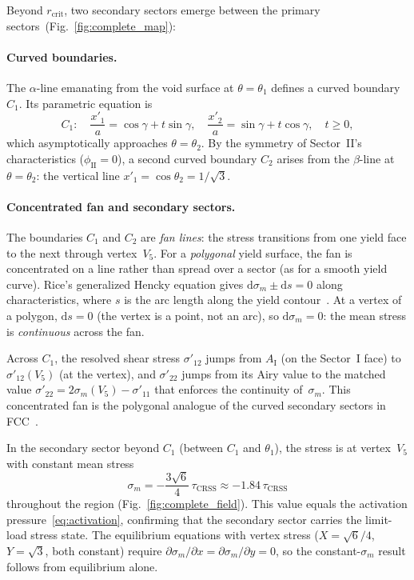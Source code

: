 \documentclass{svjour3} %
\newcommand{\diff}{\mathrm{d}}
\newcommand{\tcrss}{\tau_{\mathrm{CRSS}}}
\newcommand{\sm}{\sigma_m}
\begin{document}
Beyond $r_{\mathrm{crit}}$, two secondary sectors emerge between the
primary sectors~(Fig.~\ref{fig:complete_map}):

\paragraph{Curved boundaries.}
The $\alpha$-line emanating from the void surface at $\theta = \theta_1$
defines a curved boundary $C_1$. Its parametric equation is
\begin{equation}
\label{eq:C1}
C_1:\quad \frac{x'_1}{a} = \cos\gamma + t\sin\gamma,\quad
\frac{x'_2}{a} = \sin\gamma + t\cos\gamma, \quad t \geq 0,
\end{equation}
which asymptotically approaches $\theta = \theta_2$. By the symmetry
of Sector~II's characteristics ($\phi_{\mathrm{II}} = 0$), a second
curved boundary $C_2$ arises from the $\beta$-line at
$\theta = \theta_2$: the vertical line
$x'_1 = \cos\theta_2 = 1/\sqrt{3}$.

\paragraph{Concentrated fan and secondary sectors.}
The boundaries $C_1$ and $C_2$ are \emph{fan lines}: the stress
transitions from one yield face to the next through vertex~$V_5$.
For a \emph{polygonal} yield surface, the fan is concentrated on a
line rather than spread over a sector (as for a smooth yield
curve). Rice's generalized Hencky equation gives $\diff\sm \pm
\diff s = 0$ along characteristics, where $s$ is the arc length
along the yield contour~\citep{rice1973}. At a vertex of a polygon,
$\diff s = 0$ (the vertex is a point, not an arc), so
$\diff\sm = 0$: the mean stress is \emph{continuous} across the
fan.

Across $C_1$, the resolved shear stress $\sigma'_{12}$ jumps from
$A_{\mathrm{I}}$ (on the Sector~I face) to $\sigma'_{12}(V_5)$ (at the
vertex), and $\sigma'_{22}$ jumps from its Airy value to the matched
value $\sigma'_{22} = 2\sm(V_5) - \sigma'_{11}$ that enforces the
continuity of~$\sm$. This concentrated fan is the polygonal analogue
of the curved secondary sectors in FCC~\citep[Section~3.8]{kysar2005}.

In the secondary sector beyond $C_1$ (between $C_1$ and $\theta_1$),
the stress is at vertex~$V_5$ with constant mean stress
\begin{equation}
\label{eq:sm_secondary}
\sm = -\frac{3\sqrt{6}}{4}\,\tcrss \approx -1.84\,\tcrss
\end{equation}
throughout the region (Fig.~\ref{fig:complete_field}). This value
equals the activation pressure~\eqref{eq:activation}, confirming
that the secondary sector carries the limit-load stress state.
The equilibrium equations with vertex stress ($X = \sqrt{6}/4$,
$Y = \sqrt{3}$, both constant) require $\partial\sm/\partial x =
\partial\sm/\partial y = 0$, so the constant-$\sm$ result follows
from equilibrium alone.
\end{document}
